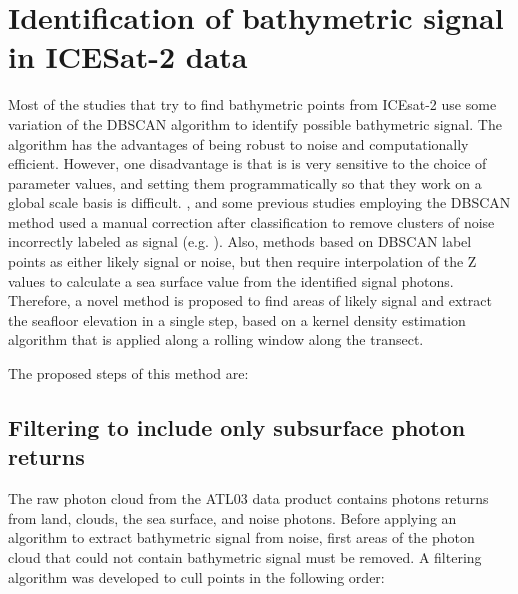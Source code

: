 \section{Identification of bathymetric signal in ICESat-2 data} \label{sec:kdesignalfinding}
Most of the studies that try to find bathymetric points from ICEsat-2 use some variation of the DBSCAN algorithm to identify possible bathymetric signal. The algorithm has the advantages of being robust to noise \cite{} and computationally efficient. However, one disadvantage is that is is very sensitive to the choice of parameter values, and setting them programmatically so that they work on a global scale basis is difficult. , and some previous studies employing the DBSCAN method used a manual correction after classification to remove clusters of noise incorrectly labeled as signal (e.g. \cite{Ma2020}). Also, methods based on DBSCAN label points as either likely signal or noise, but then require interpolation of the Z values to calculate a sea surface value from the identified signal photons. Therefore, a novel  method is proposed to find areas of likely signal and extract the seafloor elevation in a single step, based on a kernel density estimation algorithm that is applied along a rolling window along the transect.

The proposed steps of this method are:
\subsection{Filtering to include only subsurface photon returns}

The raw photon cloud from the ATL03 data product contains photons returns from land, clouds, the sea surface, and noise photons. Before applying an algorithm to extract bathymetric signal from noise, first areas of the photon cloud that could not contain bathymetric signal must be removed. A filtering algorithm was developed to cull points in the following order:

